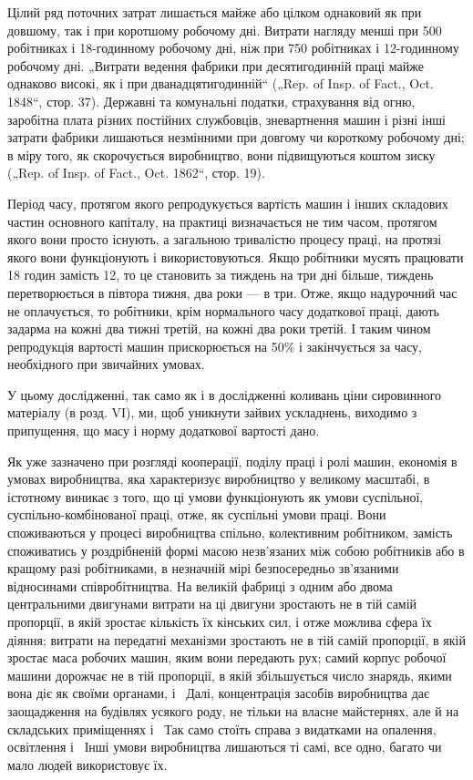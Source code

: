 Цілий ряд поточних затрат лишається майже або цілком
однаковий як при довшому, так і при коротшому робочому дні.
Витрати нагляду менші при 500 робітниках і 18-годинному робочому
дні, ніж при 750 робітниках і 12-годинному робочому дні.
„Витрати ведення фабрики при десятигодинній праці майже однаково
високі, як і при дванадцятигодинній“ („Rep. of Insp. of
Fact., Oct. 1848“, стор. 37). Державні та комунальні податки,
страхування від огню, заробітна плата різних постійних службовців,
зневартнення машин і різні інші затрати фабрики лишаються
незмінними при довгому чи короткому робочому дні;
в міру того, як скорочується виробництво, вони підвищуються
коштом зиску („Rep. of Insp. of Fact., Oct. 1862“, стор. 19).

Період часу, протягом якого репродукується вартість машин
і інших складових частин основного капіталу, на практиці визначається
не тим часом, протягом якого вони просто існують,
а загальною тривалістю процесу праці, на протязі якого вони
функціонують і використовуються. Якщо робітники мусять працювати
18 годин замість 12, то це становить за тиждень на три
дні більше, тиждень перетворюється в півтора тижня, два
роки — в три. Отже, якщо надурочний час не оплачується, то
робітники, крім нормального часу додаткової праці, дають задарма
на кожні два тижні третій, на кожні два роки третій.
І таким чином репродукція вартості машин прискорюється на 50\%
і закінчується за  часу, необхідного при звичайних умовах.

У цьому дослідженні, так само як і в дослідженні коливань
ціни сировинного матеріалу (в розд. VI), ми, щоб уникнути
зайвих ускладнень, виходимо з припущення, що масу і норму
додаткової вартості дано.

Як уже зазначено при розгляді кооперації, поділу праці
і ролі машин, економія в умовах виробництва, яка характеризує
виробництво у великому масштабі, в істотному виникає з того,
що ці умови функціонують як умови суспільної, суспільно-комбінованої
праці, отже, як суспільні умови праці. Вони
споживаються у процесі виробництва спільно, колективним робітником,
замість споживатись у роздрібненій формі масою
незв’язаних між собою робітників або в кращому разі робітниками,
в незначній мірі безпосередньо зв’язаними відносинами співробітництва.
На великій фабриці з одним або двома центральними
двигунами витрати на ці двигуни зростають не в тій самій пропорції,
в якій зростає кількість їх кінських сил, і отже можлива сфера
їх діяння; витрати на передатні механізми зростають не в тій самій
пропорції, в якій зростає маса робочих машин, яким вони передають
рух; самий корпус робочої машини дорожчає не в тій
пропорції, в якій збільшується число знарядь, якими вона діє
як своїми органами, і~ Далі, концентрація засобів виробництва
дає заощадження на будівлях усякого роду, не тільки
на власне майстернях, але й на складських приміщеннях і~
Так само стоїть справа з видатками на опалення, освітлення
і~ Інші умови виробництва лишаються ті самі, все одно,
багато чи мало людей використовує їх.

